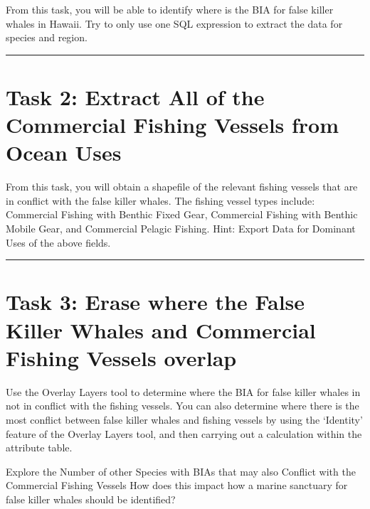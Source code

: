 \documentclass[
]{book}
\begin{document}
From this task, you will be able to identify where is the BIA for false killer whales in Hawaii. Try to only use one SQL expression to extract the data for species and region.

\begin{center}\rule{0.5\linewidth}{0.5pt}\end{center}

\hypertarget{task-2-extract-all-of-the-commercial-fishing-vessels-from-ocean-uses}{%
\section*{Task 2: Extract All of the Commercial Fishing Vessels from Ocean Uses}\label{task-2-extract-all-of-the-commercial-fishing-vessels-from-ocean-uses}}

From this task, you will obtain a shapefile of the relevant fishing vessels that are in conflict with the false killer whales. The fishing vessel types include: Commercial Fishing with Benthic Fixed Gear, Commercial Fishing with Benthic Mobile Gear, and Commercial Pelagic Fishing. Hint: Export Data for Dominant Uses of the above fields.

\begin{center}\rule{0.5\linewidth}{0.5pt}\end{center}

\hypertarget{task-3-erase-where-the-false-killer-whales-and-commercial-fishing-vessels-overlap}{%
\section*{Task 3: Erase where the False Killer Whales and Commercial Fishing Vessels overlap}\label{task-3-erase-where-the-false-killer-whales-and-commercial-fishing-vessels-overlap}}

Use the Overlay Layers tool to determine where the BIA for false killer whales in not in conflict with the fishing vessels. You can also determine where there is the most conflict between false killer whales and fishing vessels by using the `Identity' feature of the Overlay Layers tool, and then carrying out a calculation within the attribute table.

Explore the Number of other Species with BIAs that may also Conflict with the Commercial Fishing Vessels How does this impact how a marine sanctuary for false killer whales should be identified?
\end{document}
